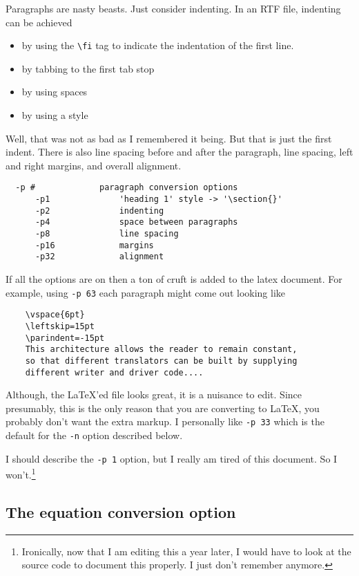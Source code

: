 \documentclass{article}
\begin{document}
Paragraphs are nasty beasts.  Just consider indenting.  In an RTF
file, indenting can be achieved
\begin{itemize}
\item by using the \verb#\fi# tag to 
indicate the indentation of the first line.  
\item by tabbing to the first tab stop
\item by using spaces
\item by using a style
\end{itemize}
Well, that was not as bad as I remembered it being.  But that is just
the first indent.  There is also line spacing before and after the paragraph,
line spacing, left and right margins, and overall alignment.  
\begin{verbatim}
  -p #             paragraph conversion options
      -p1              'heading 1' style -> '\section{}'
      -p2              indenting
      -p4              space between paragraphs
      -p8              line spacing
      -p16             margins
      -p32             alignment
\end{verbatim}
If all the options are on then a ton of cruft is added to the latex document.
For example, using \texttt{-p 63} each paragraph might come out looking like
\begin{verbatim}
    \vspace{6pt}
    \leftskip=15pt
    \parindent=-15pt
    This architecture allows the reader to remain constant, 
    so that different translators can be built by supplying 
    different writer and driver code....
\end{verbatim}
Although, the \LaTeX{}'ed file looks great, it is a nuisance to
edit.  Since presumably, this is the only reason that you are 
converting to \LaTeX{}, you probably don't want the extra markup.
I personally like \texttt{-p 33} which is the default for the 
\texttt{-n} option described below.

I should describe the \texttt{-p 1} option, but I really am tired
of this document.  So I won't.\footnote{Ironically, now that I am 
editing this a year later, I would have to look at the source code
to document this properly.  I just don't remember anymore.}

\subsection{The equation conversion option}
\end{document}
